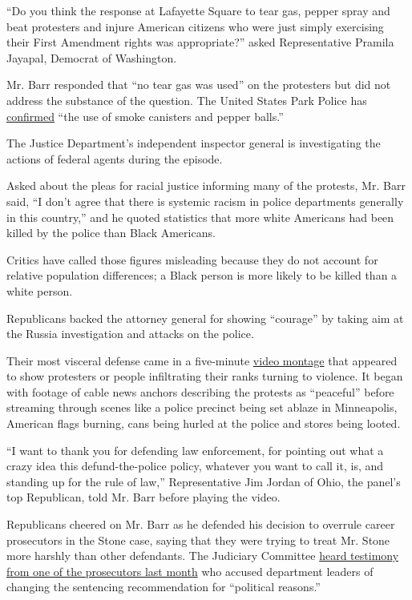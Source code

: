 ``Do you think the response at Lafayette Square to tear gas, pepper
spray and beat protesters and injure American citizens who were just
simply exercising their First Amendment rights was appropriate?'' asked
Representative Pramila Jayapal, Democrat of Washington.

Mr. Barr responded that ``no tear gas was used'' on the protesters but
did not address the substance of the question. The United States Park
Police has
\href{https://www.nps.gov/subjects/uspp/6_2_20_statement_from_acting_chief_monahan.htm}{confirmed}
``the use of smoke canisters and pepper balls.''

The Justice Department's independent inspector general is investigating
the actions of federal agents during the episode.

Asked about the pleas for racial justice informing many of the protests,
Mr. Barr said, ``I don't agree that there is systemic racism in police
departments generally in this country,'' and he quoted statistics that
more white Americans had been killed by the police than Black Americans.

Critics have called those figures misleading because they do not account
for relative population differences; a Black person is more likely to be
killed than a white person.

Republicans backed the attorney general for showing ``courage'' by
taking aim at the Russia investigation and attacks on the police.

Their most visceral defense came in a five-minute
\href{https://twitter.com/JudiciaryGOP/status/1288140402101555201}{video
montage} that appeared to show protesters or people infiltrating their
ranks turning to violence. It began with footage of cable news anchors
describing the protests as ``peaceful'' before streaming through scenes
like a police precinct being set ablaze in Minneapolis, American flags
burning, cans being hurled at the police and stores being looted.

``I want to thank you for defending law enforcement, for pointing out
what a crazy idea this defund-the-police policy, whatever you want to
call it, is, and standing up for the rule of law,'' Representative Jim
Jordan of Ohio, the panel's top Republican, told Mr. Barr before playing
the video.

Republicans cheered on Mr. Barr as he defended his decision to overrule
career prosecutors in the Stone case, saying that they were trying to
treat Mr. Stone more harshly than other defendants. The Judiciary
Committee
\href{https://www.nytimes.com/2020/06/23/us/politics/roger-stone-sentencing-politicized.html}{heard
testimony from one of the prosecutors last month} who accused department
leaders of changing the sentencing recommendation for ``political
reasons.''

